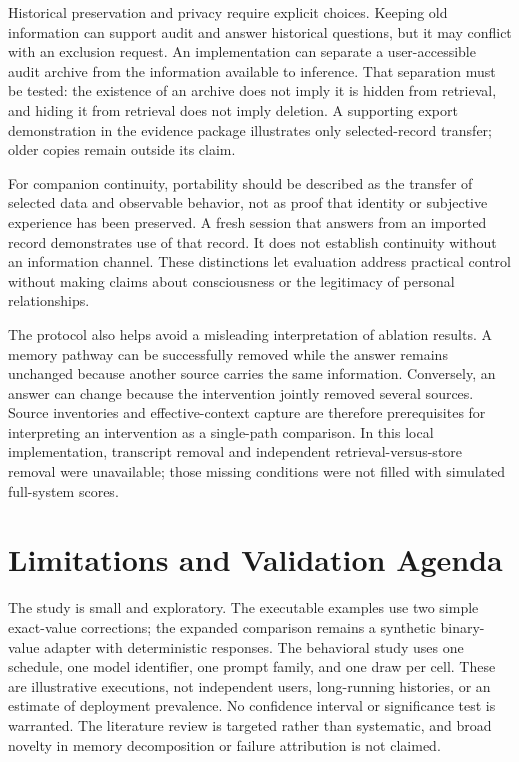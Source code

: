 \documentclass[runningheads]{llncs}
\begin{document}
Historical preservation and privacy require explicit choices. Keeping old information can support audit and answer historical questions, but it may conflict with an exclusion request. An implementation can separate a user-accessible audit archive from the information available to inference. That separation must be tested: the existence of an archive does not imply it is hidden from retrieval, and hiding it from retrieval does not imply deletion. A supporting export demonstration in the evidence package illustrates only selected-record transfer; older copies remain outside its claim.

For companion continuity, portability should be described as the transfer of selected data and observable behavior, not as proof that identity or subjective experience has been preserved. A fresh session that answers from an imported record demonstrates use of that record. It does not establish continuity without an information channel. These distinctions let evaluation address practical control without making claims about consciousness or the legitimacy of personal relationships.

The protocol also helps avoid a misleading interpretation of ablation results. A memory pathway can be successfully removed while the answer remains unchanged because another source carries the same information. Conversely, an answer can change because the intervention jointly removed several sources. Source inventories and effective-context capture are therefore prerequisites for interpreting an intervention as a single-path comparison. In this local implementation, transcript removal and independent retrieval-versus-store removal were unavailable; those missing conditions were not filled with simulated full-system scores.

\section{Limitations and Validation Agenda}
The study is small and exploratory. The executable examples use two simple exact-value corrections; the expanded comparison remains a synthetic binary-value adapter with deterministic responses. The behavioral study uses one schedule, one model identifier, one prompt family, and one draw per cell. These are illustrative executions, not independent users, long-running histories, or an estimate of deployment prevalence. No confidence interval or significance test is warranted. The literature review is targeted rather than systematic, and broad novelty in memory decomposition or failure attribution is not claimed.
\end{document}
